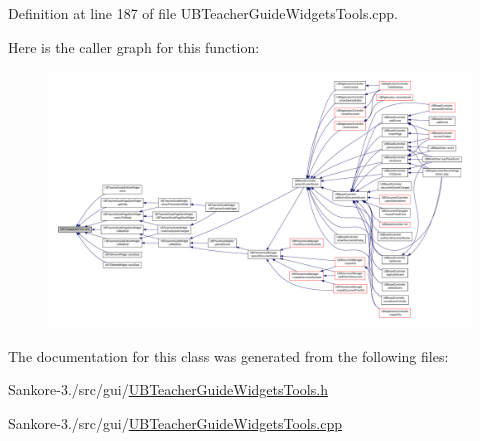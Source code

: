 Definition at line 187 of file U\-B\-Teacher\-Guide\-Widgets\-Tools.\-cpp.



Here is the caller graph for this function\-:
\nopagebreak
\begin{figure}[H]
\begin{center}
\leavevmode
\includegraphics[width=350pt]{d9/d07/class_u_b_t_g_adaptable_text_abc01215ceb6a24147b846b344b7557ce_icgraph}
\end{center}
\end{figure}




The documentation for this class was generated from the following files\-:\begin{DoxyCompactItemize}
\item 
Sankore-\/3./src/gui/\hyperlink{_u_b_teacher_guide_widgets_tools_8h}{U\-B\-Teacher\-Guide\-Widgets\-Tools.\-h}\item 
Sankore-\/3./src/gui/\hyperlink{_u_b_teacher_guide_widgets_tools_8cpp}{U\-B\-Teacher\-Guide\-Widgets\-Tools.\-cpp}\end{DoxyCompactItemize}
